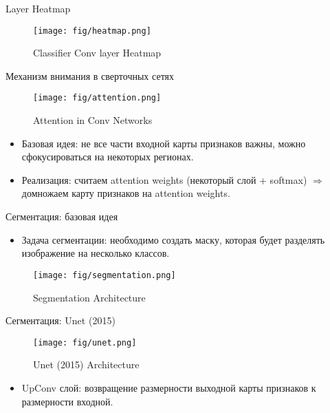 \documentclass[handout]{beamer}
\begin{document}
\begin{frame}{Layer Heatmap}
	\begin{figure}
	    \texttt{[image: fig/heatmap.png]}
	    \caption{\small Classifier Conv layer Heatmap
	    } 
	    \label{fig:w_series}
	\end{figure}
\end{frame}

\begin{frame}{Механизм внимания в сверточных сетях}
	\begin{figure}
	    \texttt{[image: fig/attention.png]}
	    \caption{\small Attention in Conv Networks
	    } 
	    \label{fig:w_series}
	\end{figure}
	\vspace*{-10pt}
	\begin{itemize}
		\item Базовая идея: не все части входной карты признаков важны, можно сфокусироваться на некоторых регионах.
		\item Реализация: считаем attention weights (некоторый слой + softmax) $\Rightarrow$ домножаем карту признаков на attention weights.
	\end{itemize}
\end{frame}

\begin{frame}{Сегментация: базовая идея}
	\begin{itemize}
		\item Задача сегментации: необходимо создать маску, которая будет разделять изображение на несколько классов.
	\end{itemize}
	\begin{figure}
	    \texttt{[image: fig/segmentation.png]}
	    \caption{\small Segmentation Architecture
	    } 
	    \label{fig:w_series}
	\end{figure}
\end{frame}

\begin{frame}{Сегментация: Unet (2015)}
	\begin{figure}
	    \texttt{[image: fig/unet.png]}
	    \caption{\small Unet (2015) Architecture
	    } 
	    \label{fig:w_series}
	\end{figure}
	\begin{itemize}
		\item UpConv слой: возвращение размерности выходной карты признаков к размерности входной.
	\end{itemize}
\end{frame}
\end{document}
